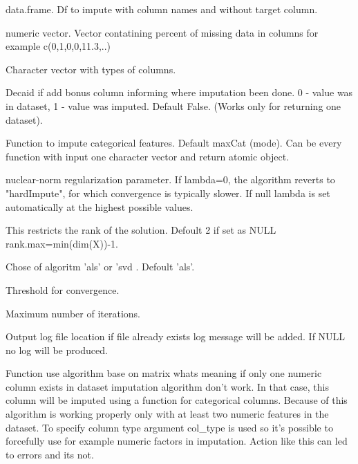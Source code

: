\documentclass[letterpaper]{book}
\begin{document}
\begin{Arguments}
\begin{ldescription}
\item[\code{df}] data.frame. Df to impute with column names and without target column.

\item[\code{percent\_of\_missing}] numeric vector. Vector contatining percent of missing data in columns for example  c(0,1,0,0,11.3,..)

\item[\code{col\_type}] Character vector with types of columns.

\item[\code{col\_0\_1}] Decaid if add bonus column informing where imputation been done. 0 - value was in dataset, 1 - value was imputed. Default False. (Works only for returning one dataset).

\item[\code{cat\_Fun}] Function to impute categorical features. Default maxCat (mode). Can be every function with input one character vector and return atomic object.

\item[\code{lambda}] nuclear-norm regularization parameter. If lambda=0, the algorithm reverts to "hardImpute", for which convergence is typically slower. If null lambda is set automatically at the highest possible values.

\item[\code{rank.max}] This restricts the rank of the solution. Defoult 2 if set as NULL rank.max=min(dim(X))-1.

\item[\code{type}] Chose of algoritm 'als' or 'svd . Defoult 'als'.

\item[\code{thresh}] Threshold for convergence.

\item[\code{maxit}] Maximum number of iterations.

\item[\code{out\_file}] Output log file location if file already exists log message will be added. If NULL no log will be produced.
\end{ldescription}
\end{Arguments}
%
\begin{Details}\relax
Function use algorithm base on matrix whats meaning if only one numeric column exists in dataset imputation algorithm don't work. In that case, this column will be imputed using a function for categorical columns. Because of this algorithm is working properly only with at least two numeric features in the dataset. To specify column type argument col\_type is used so it's possible to forcefully use for example numeric factors in imputation. Action like this can led to errors and its not.
\end{Details}
\end{document}
